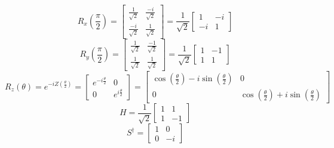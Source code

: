 \documentclass{article}
\begin{document}
\[R_x(\frac{\pi}{2}) = \begin{bmatrix}
		\frac{1}{\sqrt{2}}  & \frac{-i}{\sqrt{2}} \\
		\frac{-i}{\sqrt{2}} & \frac{1}{\sqrt{2}}
	\end{bmatrix} = \frac{1}{\sqrt{2}}
	\begin{bmatrix}
		1 & -i \\
		-i & 1
	\end{bmatrix}
\]
\[R_y(\frac{\pi}{2}) = \begin{bmatrix}
		\frac{1}{\sqrt{2}} & \frac{-1}{\sqrt{2}} \\
		\frac{1}{\sqrt{2}} & \frac{1}{\sqrt{2}}
	\end{bmatrix} = \frac{1}{\sqrt{2}} \begin{bmatrix}
		1 & -1 \\
		1 & 1
	\end{bmatrix}\]
\[
	R_z(\theta) = e^{-iZ(\frac{\theta}{2})} =
	\begin{bmatrix}
		e^{-i \frac{\theta}{2}} & 0                      \\
		0                       & e^{i \frac{\theta}{2}}
	\end{bmatrix}
	= \begin{bmatrix}
		\cos(\frac{\theta}{2}) - i \sin(\frac{\theta}{2}) & 0                      \\
		0                                                  & \cos(\frac{\theta}{2}) + i \sin(\frac{\theta}{2})
	\end{bmatrix}
\]
\[H = \frac{1}{\sqrt{2}} \begin{bmatrix}
		1 & 1 \\
		1 & -1
	\end{bmatrix}\]
\[S^\dagger = \begin{bmatrix}
	1 & 0 \\
	0 & -i
\end{bmatrix}\]
\end{document}

